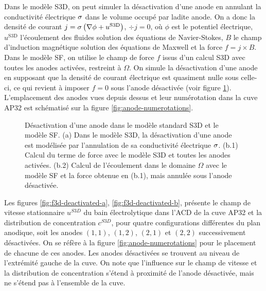 Dans le modèle S3D, on peut simuler la désactivation d'une anode en
annulant la conductivité électrique $\sigma$ dans le volume
occupé par ladite anode. On a donc la densité de courant $j =
\sigma\left( \nabla \phi + u^\mathrm{S3D} \right)$, $\div j = 0$, où
$\phi$ est le potentiel électrique, $u^\mathrm{S3D}$ l'écoulement des
fluides solution des équations de Navier-Stokes, $B$ le champ
d'induction magnétique solution des équations de Maxwell et la force
$f = j\times B$. Dans le modèle SF, on utilise le champ de force $f$
issus d'un calcul S3D avec toutes les anodes activées, restreint à
$\Omega$. On simule la désactivation d'une anode en supposant que la
densité de courant électrique est quasiment nulle sous celle-ci, ce
qui revient à imposer $f = 0$ sous l'anode désactivée (voir figure
\ref{fig:anode-deactivation}). L'emplacement des anodes vues depuis
dessus et leur numérotation dans la cuve AP32 est schématisé sur la
figure \ref{fig:anode-numerotations}.

\begin{figure}[h!]
  \begin{center}
    
    \caption{Désactivation d'une anode dans le modèle standard S3D et
      le modèle SF. (a) Dans le modèle S3D, la désactivation d'une
      anode est modélisée par l'annulation de sa conductivité
      électrique $\sigma$. (b.1) Calcul du terme de force avec
      le modèle S3D et toutes les anodes activées. (b.2) Calcul de
      l'écoulement dans le domaine $\Omega$ avec le modèle SF et la
      force obtenue en (b.1), mais annulée sous l'anode désactivée.}
    \label{fig:anode-deactivation}
  \end{center}
\end{figure}

Les figures \ref{fig:f3d-deactivated-a}, \ref{fig:f3d-deactivated-b},
présente le champ de vitesse stationnaire $u^{S3D}$ du bain
électrolytique dans l'ACD de la cuve AP32 et la distribution de
concentration $c^{S3D}$, pour quatre configurations différentes du
plan anodique, soit les anodes $(1,1)$, $(1,2)$, $(2,1)$ et $(2,2)$
successivement désactivées. On se réfère à la figure
\ref{fig:anode-numerotations} pour le placement de chacune de ces
anodes. Les anodes désactivées se trouvent au niveau de l'extrémité
gauche de la cuve. On note que l'influence sur le champ de vitesse et
la distribution de concentration s'étend à proximité de l'anode
désactivée, mais ne s'étend pas à l'ensemble de la cuve.

